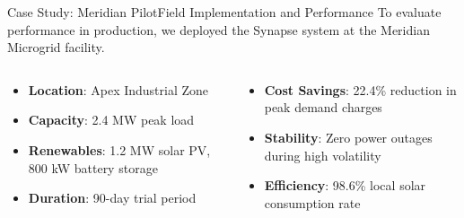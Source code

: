 \begin{frame}{Case Study: Meridian Pilot}{Field Implementation and Performance}
  To evaluate performance in production, we deployed the Synapse system at the Meridian Microgrid facility.
  \vspace{0.4cm}
  
  \begin{columns}[T]
    \begin{column}{0.48\textwidth}
      \begin{tcolorbox}[
        colback=VertexBlue!5,
        colframe=VertexBlue,
        title=Deployment Profile,
        fonttitle=\bfseries\small,
        arc=2mm,
        left=2mm, right=2mm, top=2mm, bottom=2mm
      ]
        \small
        \begin{itemize}
          \item \textbf{Location}: Apex Industrial Zone
          \item \textbf{Capacity}: 2.4 MW peak load
          \item \textbf{Renewables}: 1.2 MW solar PV, 800 kW battery storage
          \item \textbf{Duration}: 90-day trial period
        \end{itemize}
      \end{tcolorbox}
    \end{column}
    
    \begin{column}{0.48\textwidth}
      \begin{tcolorbox}[
        colback=VertexTeal!5,
        colframe=VertexTeal,
        title=Key Outcomes,
        fonttitle=\bfseries\small,
        arc=2mm,
        left=2mm, right=2mm, top=2mm, bottom=2mm
      ]
        \small
        \begin{itemize}
          \item \textbf{Cost Savings}: 22.4\% reduction in peak demand charges
          \item \textbf{Stability}: Zero power outages during high volatility
          \item \textbf{Efficiency}: 98.6\% local solar consumption rate
        \end{itemize}
      \end{tcolorbox}
    \end{column}
  \end{columns}
\end{frame}
